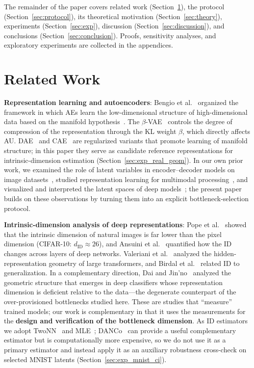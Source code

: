 \documentclass[make,article,submit,pdftex,moreauthors]{Definitions/mdpi}
\newcommand{\dID}{d_{\mathrm{ID}}}
\begin{document}
The remainder of the paper covers related work (Section~\ref{sec:related}),
the protocol (Section~\ref{sec:protocol}), its theoretical motivation
(Section~\ref{sec:theory}), experiments (Section~\ref{sec:exp}), discussion
(Section~\ref{sec:discussion}), and conclusions
(Section~\ref{sec:conclusion}).
Proofs, sensitivity analyses, and exploratory experiments are collected in
the appendices.

\section{Related Work}\label{sec:related}

\textbf{Representation learning and autoencoders}:
Bengio et al.~\cite{bengio2013representation} organized the framework in
which AEs learn the low-dimensional structure of high-dimensional data based
on the manifold hypothesis~\cite{fefferman2016manifold}.
The $\beta$-VAE~\cite{higgins2017betavae} controls the degree of compression
of the representation through the KL weight $\beta$, which directly affects
AU.
DAE~\cite{alain2014dae} and CAE~\cite{rifai2011cae} are regularized variants
that promote learning of manifold structure; in this paper they serve as
candidate reference representations for intrinsic-dimension estimation
(Section~\ref{sec:exp_real_geom}).
In our own prior work, we examined the role of latent variables in
encoder--decoder models on image datasets~\cite{okamoto2023latent}, studied
representation learning for multimodal processing~\cite{jinno2023multimodal},
and visualized and interpreted the latent spaces of deep
models~\cite{dai2024latent}; the present paper builds on these observations
by turning them into an explicit bottleneck-selection protocol.

\textbf{Intrinsic-dimension analysis of deep representations}:
Pope et al.~\cite{pope2021intrinsic} showed that the intrinsic dimension of
natural images is far lower than the pixel dimension (CIFAR-10:
$\dID \approx 26$), and Ansuini et al.~\cite{ansuini2019intrinsic}
quantified how the ID changes across layers of deep networks.
Valeriani et al.~\cite{valeriani2023geometry} analyzed the hidden-representation
geometry of large transformers, and Birdal et
al.~\cite{birdal2021intrinsic} related ID to generalization.
In a complementary direction, Dai and Jin'no~\cite{dai2026island} analyzed
the geometric structure that emerges in deep classifiers whose
representation dimension is deficient relative to the data---the
degenerate counterpart of the over-provisioned bottlenecks studied here.
These are studies that ``measure'' trained models; our work is complementary
in that it uses the measurements for the \textbf{design and verification of
the bottleneck dimension}.
As ID estimators we adopt TwoNN~\cite{facco2017twonn} and
MLE~\cite{levina2005mle}; DANCo~\cite{ceruti2014danco} can provide a useful
complementary estimator but is computationally more expensive, so we do not
use it as a primary estimator and
instead apply it as an auxiliary robustness cross-check on selected MNIST
latents (Section~\ref{sec:exp_mnist_ci}).
\end{document}
